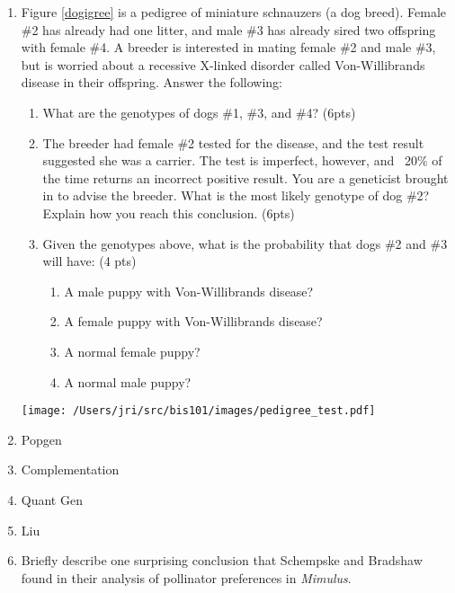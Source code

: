 \documentclass[]{article}
\begin{document}
\begin{enumerate}

\item Figure \ref{dogigree} is a pedigree of miniature schnauzers (a dog breed). Female \#2 has already had one litter, and male \#3 has already sired two offspring with female \#4. A breeder is interested in mating female \#2 and male \#3, but is worried about a recessive X-linked disorder called Von-Willibrands disease in their offspring. Answer the following:

\begin{enumerate}
\item What are the genotypes of dogs \#1, \#3, and \#4? (6pts)
\item The breeder had female \#2 tested for the disease, and the test result suggested she was a carrier. The test is imperfect, however, and ~20\% of the time returns an incorrect positive result. You are a geneticist brought in to advise the breeder. What is the most likely genotype of dog \#2? Explain how you reach this conclusion. (6pts)
\item Given the genotypes above, what is the probability that dogs \#2 and \#3 will have: (4 pts)
\begin{enumerate}
\item A male puppy with Von-Willibrands disease?
\item A female puppy with Von-Willibrands disease?
\item A normal female puppy?
\item A normal male puppy?
\end{enumerate}
\end{enumerate}

\begin{figure*}[h]
  \begin{center}
   \texttt{[image: /Users/jri/src/bis101/images/pedigree\_test.pdf]}
\label{dogigree}
\caption{A pedigree of miniature schnauzers. Filled symbols (square=male, circle=female) represent dogs with Von-Willibrands disease. Empty symbols are dogs with wild-type phenotypes.}
  \end{center}
\end{figure*}

\item Popgen

\item Complementation

\item Quant Gen

\item Liu

\item Briefly describe one surprising conclusion that Schempske and Bradshaw found in their analysis of pollinator preferences in \emph{Mimulus}.


\end{enumerate}
\end{document}
